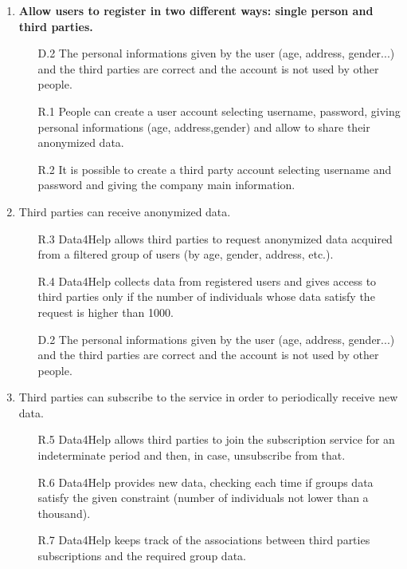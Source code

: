 \documentclass[a4paper]{article}
\begin{document}
    \begin{enumerate}[label*=\bf{G.\arabic*}]
        
        
        \item \textbf{Allow users to register in two different ways: single person and third parties.}
        
        \begin{enumerate}
            \item [D.2] The personal informations given by the user (age, address, gender...) and the third parties are correct and the account is not used by other people. 
            \item [R.1] People can create a user account selecting username, password, giving personal informations (age, address,gender) and allow to share their anonymized data.
            \item [R.2] It is possible to create a third party account selecting username and password and giving the company main information.
        \end{enumerate}
        
        \item Third parties can receive anonymized data.
                
            \begin{enumerate}
                \item [R.3] Data4Help allows third parties to request anonymized data acquired from a filtered group of users (by age, gender, address, etc.).
                \item [R.4] Data4Help collects data from registered users and gives access to third parties only if the number of individuals whose data satisfy the request is higher than 1000.
                \item [D.2] The personal informations given by the user (age, address, gender...) and the third parties are correct and the account is not used by other people.
            \end{enumerate}
            
            
        \item Third parties can subscribe to the service in order to periodically receive new data.
        
        \begin{enumerate}
            \item [R.5] Data4Help allows third parties to join the subscription service for an indeterminate period and then, in case, unsubscribe from that.
            \item [R.6] Data4Help provides new data, checking each time if groups data satisfy the given constraint (number of individuals not lower than a thousand).
            \item [R.7] Data4Help keeps track of the associations between third parties subscriptions and the required group data.
        \end{enumerate}
        

\end{enumerate}
\end{document}
